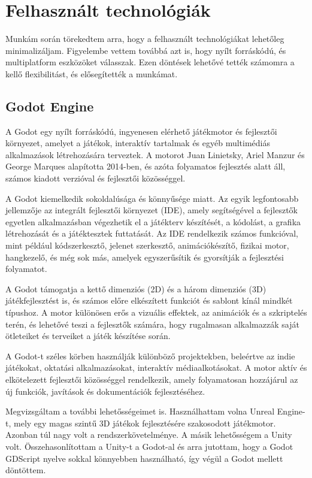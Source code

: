\chapter{Felhasznált technológiák}

\thispagestyle{fancy}
\pagestyle{fancy}

Munkám során törekedtem arra, hogy a felhasznált technológiákat lehetőleg minimalizáljam. 
Figyelembe vettem továbbá azt is, hogy nyílt forráskódú, és multiplatform eszközöket válasszak. Ezen döntések lehetővé tették számomra a kellő flexibilitást, és elősegítették a munkámat.
\section{Godot Engine}
A Godot egy nyílt forráskódú, ingyenesen elérhető játékmotor és fejlesztői környezet, amelyet a játékok, interaktív tartalmak és egyéb multimédiás alkalmazások létrehozására terveztek. A motorot Juan Linietsky, Ariel Manzur és George Marques alapította 2014-ben, és azóta folyamatos fejlesztés alatt áll, számos kiadott verzióval és fejlesztői közösséggel.

A Godot kiemelkedik sokoldalúsága és könnyűsége miatt. Az egyik legfontosabb jellemzője az integrált fejlesztői környezet (IDE), amely segítségével a fejlesztők egyetlen alkalmazásban végezhetik el a játékterv készítését, a kódolást, a grafika létrehozását és a játéktesztek futtatását. Az IDE rendelkezik számos funkcióval, mint például kódszerkesztő, jelenet szerkesztő, animációkészítő, fizikai motor, hangkezelő, és még sok más, amelyek egyszerűsítik és gyorsítják a fejlesztési folyamatot.

A Godot támogatja a kettő dimenziós (2D) és a három dimenziós (3D) játékfejlesztést is, és számos előre elkészített funkciót és sablont kínál mindkét típushoz. A motor különösen erős a vizuális effektek, az animációk és a szkriptelés terén, és lehetővé teszi a fejlesztők számára, hogy rugalmasan alkalmazzák saját ötleteiket és terveiket a játék készítése során.
 
A Godot-t széles körben használják különböző projektekben, beleértve az indie játékokat, oktatási alkalmazásokat, interaktív médiaalkotásokat. A motor aktív és elkötelezett fejlesztői közösséggel rendelkezik, amely folyamatosan hozzájárul az új funkciók, javítások és dokumentációk fejlesztéséhez.

Megvizsgáltam a további lehetősségeimet is. Használhattam volna Unreal Engine-t, mely egy magas szintű 3D játékok fejlesztésére szakosodott játékmotor.
Azonban túl nagy volt a rendszerkövetelménye. A másik lehetősségem a Unity volt.
Összehasonlítottam a Unity-t a Godot-al és arra jutottam, hogy a Godot GDScript nyelve sokkal könnyebben használható, így végül a Godot mellett döntöttem. 

